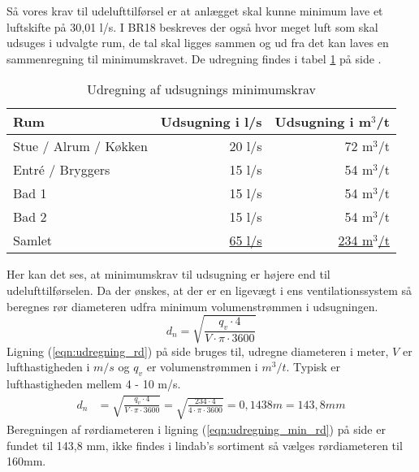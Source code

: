 Så vores krav til udelufttilførsel er at anlægget skal kunne minimum lave et luftskifte på 30,01 l/s.
I BR18 beskreves der også hvor meget luft som skal udsuges i udvalgte rum, 
de tal skal ligges sammen og ud fra det kan laves en sammenregning til minimumskravet. De udregning findes i tabel \ref{table:samregn_vent_ud} på side \pageref{table:samregn_vent_ud}.
\begin{table}[!h]
    \begin{center}
       \begin{tabular}{|l|r|r|}
           \hline
           Rum & Udsugning i l/s & Udsugning i m$^3$/t \\
           \hline
           Stue / Alrum / Køkken & 20 l/s & 72 m$^3$/t\\
           Entré / Bryggers  & 15 l/s & 54 m$^3$/t\\
           Bad 1             & 15 l/s & 54 m$^3$/t\\
           Bad 2             & 15 l/s & 54 m$^3$/t\\
           \hline
           \hline
           Samlet & \underline{65 l/s} & \underline{234 m$^3$/t} \\
           \hline
       \end{tabular}
   \end{center}
   \caption{Udregning af udsugnings minimumskrav}
   \label{table:samregn_vent_ud}
\end{table}
Her kan det ses, at minimumskrav til udsugning er højere end til udelufttilførselen. 
Da der ønskes, at der er en ligevægt i ens ventilationssystem så beregnes rør diameteren udfra minimum volumenstrømmen i udsugningen.
\begin{equation}\label{eqn:udregning_rd}
d_{n} = \sqrt{ \frac{q_{v} \cdot 4}{V\cdot\pi\cdot3600}}
\end{equation}
Ligning (\ref{eqn:udregning_rd}) på side \pageref{eqn:udregning_rd} bruges til, udregne diameteren i meter, $V$ er lufthastigheden i $m/s$ og $q_v$ er volumenstrømmen i $m^{3}/t$.
Typisk er lufthastigheden mellem 4 - 10 m/s. 
\begin{align} \label{eqn:udregning_min_rd} 
    d_{n}       &= \sqrt{ \frac{q_{v} \cdot 4}{V\cdot\pi\cdot3600}} = \sqrt{ \frac{234 \cdot 4}{4\cdot\pi\cdot3600}} = 0,1438 m = 143,8 mm
\end{align}
Beregningen af rørdiameteren i ligning (\ref{eqn:udregning_min_rd}) på side \pageref{eqn:udregning_min_rd} er fundet til 143,8 mm, 
ikke findes i lindab's sortiment så vælges rørdiameteren til 160mm.

